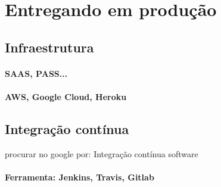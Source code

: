 \chapter{Entregando em produção}

\section{Infraestrutura}

\subsubsection{SAAS, PASS...}

\subsubsection{AWS, Google Cloud, Heroku}

\section{Integração contínua}

procurar no google por: Integração contínua software

\subsubsection{Ferramenta: Jenkins, Travis, Gitlab}
